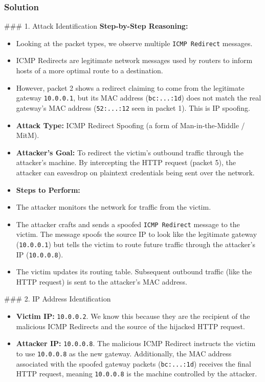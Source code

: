 \documentclass{article}
\begin{document}
\subsubsection*{Solution}
\#\#\# 1. Attack Identification
\textbf{Step-by-Step Reasoning:}
\begin{itemize}
    \item Looking at the packet types, we observe multiple \texttt{ICMP Redirect} messages.
    \item ICMP Redirects are legitimate network messages used by routers to inform hosts of a more optimal route to a destination.
    \item However, packet 2 shows a redirect claiming to come from the legitimate gateway \texttt{10.0.0.1}, but its MAC address (\texttt{bc:...:1d}) does not match the real gateway's MAC address (\texttt{52:...:12} seen in packet 1). This is IP spoofing.
    \item \textbf{Attack Type:} ICMP Redirect Spoofing (a form of Man-in-the-Middle / MitM).
    \item \textbf{Attacker's Goal:} To redirect the victim's outbound traffic through the attacker's machine. By intercepting the HTTP request (packet 5), the attacker can eavesdrop on plaintext credentials being sent over the network.
    \item \textbf{Steps to Perform:}
    \item[\textbf{1.}] The attacker monitors the network for traffic from the victim.
    \item[\textbf{2.}] The attacker crafts and sends a spoofed \texttt{ICMP Redirect} message to the victim. The message spoofs the source IP to look like the legitimate gateway (\texttt{10.0.0.1}) but tells the victim to route future traffic through the attacker's IP (\texttt{10.0.0.8}).
    \item[\textbf{3.}] The victim updates its routing table. Subsequent outbound traffic (like the HTTP request) is sent to the attacker's MAC address.

\end{itemize}
\#\#\# 2. IP Address Identification
\begin{itemize}
    \item \textbf{Victim IP:} \texttt{10.0.0.2}. We know this because they are the recipient of the malicious ICMP Redirects and the source of the hijacked HTTP request.
    \item \textbf{Attacker IP:} \texttt{10.0.0.8}. The malicious ICMP Redirect instructs the victim to use \texttt{10.0.0.8} as the new gateway. Additionally, the MAC address associated with the spoofed gateway packets (\texttt{bc:...:1d}) receives the final HTTP request, meaning \texttt{10.0.0.8} is the machine controlled by the attacker.

\end{itemize}
\end{document}
